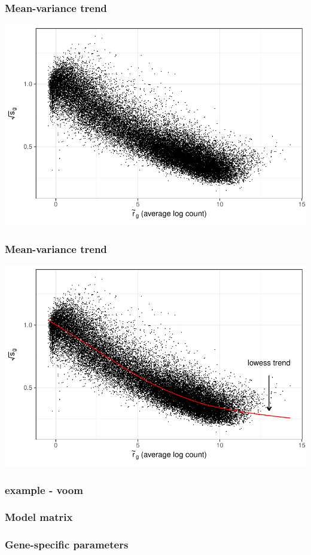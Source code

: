 \documentclass{beamer}
\begin{document}
\begin{frame}[label=current]
\frametitle{Mean-variance trend}
\includegraphics[width=\textwidth]{voom1}
\end{frame}

\begin{frame}[label=current]
\frametitle{Mean-variance trend}
\includegraphics[width=\textwidth]{voom2}
\end{frame}

\begin{frame}
\frametitle{example - voom}
\end{frame}

\begin{frame}
\frametitle{Model matrix}
\end{frame}

\begin{frame}
\frametitle{Gene-specific parameters}
\end{frame}
\end{document}
